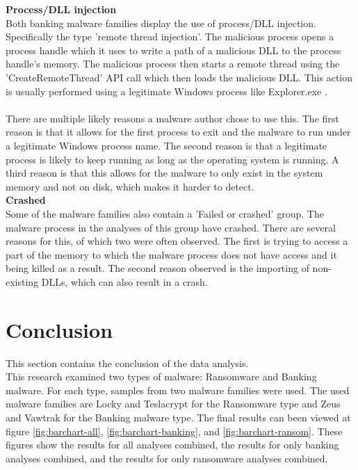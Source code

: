 \documentclass[conference]{IEEEtran}
\begin{document}
\textbf{Process/DLL injection}\\
Both banking malware families display the use of process/DLL injection. Specifically the type 'remote thread injection'. The malicious process opens a process handle which it uses to write a path of a malicious DLL to the process handle's memory. The malicious process then starts a remote thread using the 'CreateRemoteThread' API call which then loads the malicious DLL. This action is usually performed using a legitimate Windows process like Explorer.exe  \cite{alasiri-dll-injection}.\\\\There are multiple likely reasons a malware author chose to use this. The first reason is that it allows for the first process to exit and the malware to run under a legitimate Windows process name. The second reason is that a legitimate process is likely to keep running as long as the operating system is running. A third reason is that this allows for the malware to only exist in the system memory and not on disk, which makes it harder to detect.\\

\textbf{Crashed}\\
Some of the malware families also contain a 'Failed or crashed' group. The malware process in the analyses of this group have crashed. There are several reasons for this, of which two were often observed. The first is trying to access a part of the memory to which the malware process does not have access and it being killed as a result. The second reason observed is the importing of non-existing DLLs, which can also result in a crash.

\section{Conclusion}
This section contains the conclusion of the data analysis.\\ This research examined two types of malware: Ransomware and Banking malware. For each type, samples from two malware families were used. The used malware families are Locky and Teslacrypt for the Ransomware type and Zeus and Vawtrak for the Banking malware type. The final results can been viewed at figure \ref{fig:barchart-all}, \ref{fig:barchart-banking}, and \ref{fig:barchart-ransom}. These figures show the results for all analyses combined, the results for only banking analyses combined, and the results for only ransomware analyses combined.
\end{document}
